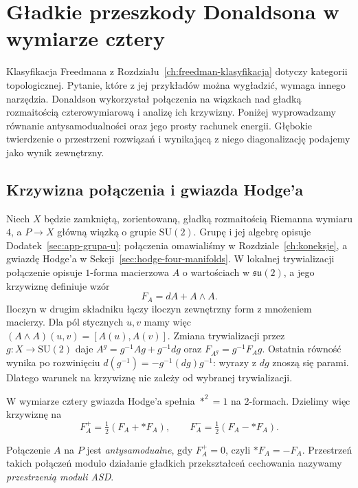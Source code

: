 \chapter{Gładkie przeszkody Donaldsona w wymiarze cztery}
\label{ch:donaldson}

Klasyfikacja Freedmana z Rozdziału~\ref{ch:freedman-klasyfikacja}
dotyczy kategorii topologicznej. Pytanie, które z jej przykładów
można wygładzić, wymaga innego narzędzia. Donaldson wykorzystał
połączenia na wiązkach nad gładką rozmaitością czterowymiarową
i analizę ich krzywizny. Poniżej wyprowadzamy równanie
antysamodualności oraz jego prosty rachunek energii. Głębokie
twierdzenie o przestrzeni rozwiązań i wynikającą z niego
diagonalizację podajemy jako wynik zewnętrzny.

\section{Krzywizna połączenia i gwiazda Hodge'a}
\label{sec:donaldson-asd}

Niech $X$ będzie zamkniętą, zorientowaną, gładką
rozmaitością Riemanna wymiaru $4$, a $P\to X$ główną
wiązką o grupie $\mathrm{SU}(2)$. Grupę i jej algebrę
opisuje Dodatek~\ref{sec:app-grupa-u}; połączenia
omawialiśmy w Rozdziale~\ref{ch:koneksje}, a gwiazdę Hodge'a
w Sekcji~\ref{sec:hodge-four-manifolds}.
W lokalnej trywializacji połączenie opisuje
$1$-forma macierzowa $A$ o wartościach w
$\mathfrak{su}(2)$, a jego krzywiznę definiuje wzór
\begin{equation}\label{eq:donaldson-curvature}
 F_A=dA+A\wedge A.
\end{equation}
Iloczyn w drugim składniku łączy iloczyn zewnętrzny form
z mnożeniem macierzy. Dla pól stycznych $u,v$ mamy więc
$(A\wedge A)(u,v)=[A(u),A(v)]$.
Zmiana trywializacji przez $g:X\to\mathrm{SU}(2)$ daje
$A^g=g^{-1}Ag+g^{-1}dg$ oraz
$F_{A^g}=g^{-1}F_Ag$. Ostatnia równość wynika po
rozwinięciu $d(g^{-1})=-g^{-1}(dg)g^{-1}$:
wyrazy z $dg$ znoszą się parami. Dlatego warunek
na krzywiznę nie zależy od wybranej trywializacji.

W wymiarze cztery gwiazda Hodge'a spełnia
$*^2=1$ na $2$-formach. Dzielimy więc krzywiznę na
\[
 F_A^+=\tfrac12(F_A+*F_A),\qquad
 F_A^-=\tfrac12(F_A-*F_A).
\]

\begin{definicja}
\label{def:donaldson-asd}
Połączenie $A$ na $P$ jest \emph{antysamodualne},
gdy $F_A^+=0$, czyli $*F_A=-F_A$.
Przestrzeń takich połączeń modulo działanie
gładkich przekształceń cechowania nazywamy
\emph{przestrzenią moduli ASD}.
\end{definicja}

